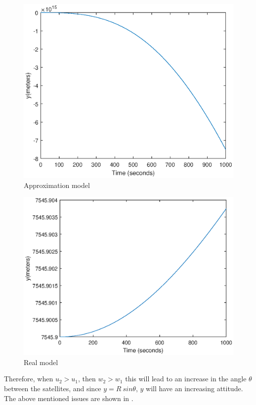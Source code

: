 \begin{table}[H]
	\begin{minipage}[b]{0.49\linewidth}
		\centering
		\begin{figure}[H]
			\centering
			\includegraphics[width=1\linewidth]{figures/pic2.eps}
			\caption{Approximation model}
			\label{fig:u1}
		\end{figure}
	\end{minipage}\hfill
	\begin{minipage}[b]{0.49\linewidth}
		\centering
		\begin{figure}[H]
			\centering
			\includegraphics[width=1\linewidth]{figures/pic1.eps}
			\caption{Real model}
			\label{fig:u2}
		\end{figure}
	\end{minipage}
\end{table}
Therefore, when $u_2 > u_1$, then $w_2 > w_1$ this will lead to an increase in the angle $\theta$ between the satellites, and since $y = R \ sin\theta$, $y$ will have an increasing attitude. The above mentioned issues are shown in .

